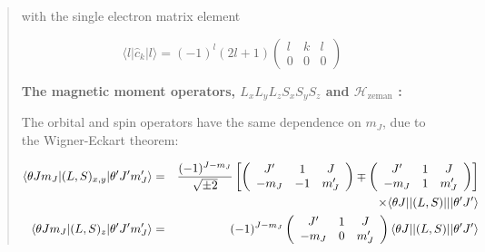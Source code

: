 \begin{quotation}
\noindent with the single electron matrix element

\begin{equation} \label{iccf1ematel}
\langle l | \hat{c}_k | l \rangle = (-1)^l (2l+1) \left( \begin{array}{ccc} l & k & l \\ 0 & 0 & 0
\end{array} \right)
\end{equation}

%
%
%
\item[\bf The magnetic moment operators, $L_x L_y L_z S_x S_y S_z$ and $\mathcal H_{\mathrm{zeman}}$ :]

The orbital and spin operators have the same dependence on $m_J$, due to the Wigner-Eckart theorem:

\begin{eqnarray}
\langle \theta Jm_J|(L,S)_{x,y}|\theta'J'm_J'\rangle &=& \frac{(-1)^{J-m_J}}{\sqrt{\pm 2}}
 \left[ \left( \begin{array}{ccc} J'&1&J \\ -m_J&-1&m'_J \end{array} \right) \mp \left( \begin{array}{ccc} J'&1&J \\ -m_J&1&m'_J \end{array} \right) \right] \\ \nonumber  
 && \qquad \times \langle \theta J||(L,S)|||\theta'J'\rangle \\
    \langle \theta Jm_J|(L,S)_z|\theta'J'm_J'\rangle &=& (-1)^{J-m_J}
    \left( \begin{array}{ccc} J'&1&J \\ -m_J&0&m'_J \end{array} \right) \langle \theta J||(L,S)||\theta'J'\rangle
\end{eqnarray}


\end{quotation}
